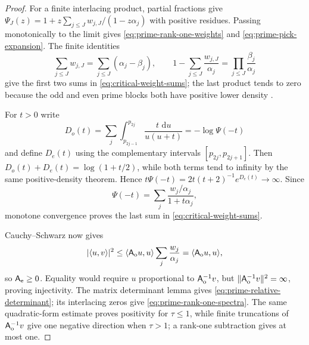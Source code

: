 \documentclass[11pt]{article}
\theoremstyle{definition}
\theoremstyle{remark}
\newcommand{\dd}{\,\mathrm d}
\begin{document}
\begin{proof}
For a finite interlacing product, partial fractions give
$\Psi_J(z)=1+z\sum_{j\le J}w_{j,J}/(1-z\alpha_j)$ with positive residues.
Passing monotonically to the limit gives \eqref{eq:prime-rank-one-weights} and
\eqref{eq:prime-pick-expansion}.  The finite identities
\[
 \sum_{j\le J}w_{j,J}=\sum_{j\le J}(\alpha_j-\beta_j),
 \qquad
 1-\sum_{j\le J}\frac{w_{j,J}}{\alpha_j}
 =\prod_{j\le J}\frac{\beta_j}{\alpha_j}
\]
give the first two sums in \eqref{eq:critical-weight-sums}; the last product tends to
zero because the odd and even prime blocks both have positive lower density
\cite{ChungLi}.

For $t>0$ write
\[
 D_o(t)=\sum_j\int_{p_{2j-1}}^{p_{2j}}\frac{t\,\dd u}{u(u+t)}=-\log\Psi(-t)
\]
and define $D_e(t)$ using the complementary intervals
$[p_{2j},p_{2j+1}]$.  Then
$D_o(t)+D_e(t)=\log(1+t/2)$, while both terms tend to infinity by the same
positive-density theorem.  Hence
$t\Psi(-t)=2t(t+2)^{-1}e^{D_e(t)}\to\infty$.  Since
\[
 \Psi(-t)=\sum_j\frac{w_j/\alpha_j}{1+t\alpha_j},
\]
monotone convergence proves the last sum in
\eqref{eq:critical-weight-sums}.

Cauchy--Schwarz now gives
\[
 |\langle u,v\rangle|^2\le
 \langle \mathsf A_{\rm o}u,u\rangle\sum_j\frac{w_j}{\alpha_j}
 =\langle \mathsf A_{\rm o}u,u\rangle,
\]
so $\mathsf A_{\rm e}\ge0$.  Equality would require $u$ proportional to
$\mathsf A_{\rm o}^{-1}v$, but
$\|\mathsf A_{\rm o}^{-1}v\|^2=\infty$, proving injectivity.  The matrix determinant
lemma gives
\eqref{eq:prime-relative-determinant}; its interlacing zeros give
\eqref{eq:prime-rank-one-spectra}.  The same quadratic-form estimate proves positivity
for $\tau\le1$, while finite truncations of $\mathsf A_{\rm o}^{-1}v$ give one negative direction when
$\tau>1$; a rank-one subtraction gives at most one.


\end{proof}
\end{document}
